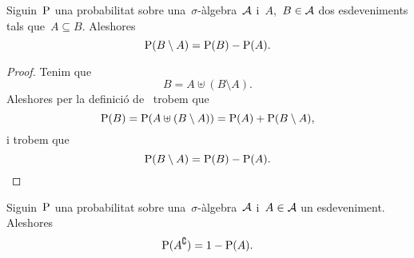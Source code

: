 \documentclass[../../Main.tex]{subfiles}
\begin{document}
	\begin{proposition}
		\label{prop:probabilitat de la resta de esdeveniments}
		Siguin~\(\mathrm{P}\) una probabilitat sobre una~\(\sigma\)-àlgebra~\(\mathcal{A}\) i~\(A\),~\(B\in\mathcal{A}\) dos esdeveniments tals que~\(A\subseteq B\). Aleshores
		\[\mathrm{P}(B\setminus A)=\mathrm{P}(B)-\mathrm{P}(A).\]
		\begin{proof}
			Tenim que
			\[B=A\uplus(B\setminus A).\]
			Aleshores per la definició de~ trobem que
			\[\mathrm{P}(B)=\mathrm{P}(A\uplus(B\setminus A))=\mathrm{P}(A)+\mathrm{P}(B\setminus A),\]
			i trobem que
			\[\mathrm{P}(B\setminus A)=\mathrm{P}(B)-\mathrm{P}(A).\]
		\end{proof}
	\end{proposition}
	\begin{corollary}
		\label{cor:probabilitat del complementari}
		Siguin~\(\mathrm{P}\) una probabilitat sobre una~\(\sigma\)-àlgebra~\(\mathcal{A}\) i~\(A\in\mathcal{A}\) un esdeveniment. Aleshores
		\[\mathrm{P}(A^{\complement})=1-\mathrm{P}(A).\qedhere\]
	\end{corollary}
\end{document}
